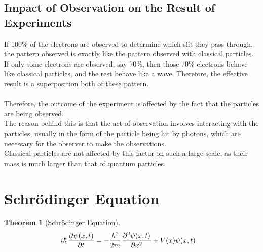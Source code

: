 \documentclass[titlepage, fleqn, a4paper, 12pt, twoside]{article}
\theoremstyle{definition}
\theoremstyle{theorem}
\newtheorem{theorem}{Theorem}
\begin{document}
\subsection{Impact of Observation on the Result of Experiments}

If 100\% of the electrons are observed to determine which slit they pass through, the pattern observed is exactly like the pattern observed with classical particles.\\
If only some electrons are observed, say 70\%, then those 70\% electrons behave like classical particles, and the rest behave like a wave.
Therefore, the effective result is a superposition both of these pattern.\\
~\\
Therefore, the outcome of the experiment is affected by the fact that the particles are being observed.\\
The reason behind this is that the act of observation involves interacting with the particles, usually in the form of the particle being hit by photons, which are necessary for the observer to make the observations.\\
Classical particles are not affected by this factor on such a large scale, as their mass is much larger than that of quantum particles.

\section{Schrödinger Equation}

\begin{theorem}[Schrödinger Equation]
	\begin{align*}
		i \hbar \dpd{\psi(x,t)}{t} & = -\frac{\hbar^2}{2 m} \dpd[2]{\psi(x,t)}{x} + V(x) \psi(x,t)
	\end{align*}
	\label{Schrodinger_Equation}
\end{theorem}
\end{document}
